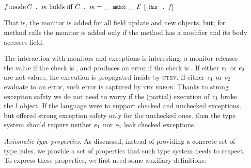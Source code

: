 $%
\f\, \text{inside}\, C\singleDot\m\text{ holds iff }
C\singleDot\m=\_\,\Kw{method}\_\,\ctx[\Kw{this}\singleDot\f]
$


That is, the monitor is added for all field update and new objects, but;
for method calls the monitor is added only if the method has a \Q@mut@ modifier and its body accesses \Q@capsule@ field.

The interaction with monitors and exceptions is interesting:
a monitor releases the value if the check is \Q@true@, and produces an error if the 
check is \Q@false@.
If either ${\mathit{e}}_1$ or ${\mathit{e}}_2$ are not values, the execution is propagated inside
by \textsc{ctxv}.
If either ${\mathit{e}}_1$ or ${\mathit{e}}_2$ evaluate to an error, such error is captured by 
\textsc{try error}.
Thanks to strong exception safety
we do not need to worry
if the (partial) execution of ${\mathit{e}}_1$ broke the $l$ object.
If the language were to support checked and unchecked exceptions, but offered 
strong exception safety only for the unchecked ones, then 
the type system should require neither ${\mathit{e}}_1$ nor ${\mathit{e}}_2$ leak 
checked exceptions.








\loseSpace
\noindent\textit{Axiomatic type properties:}
As discussed, instead of providing a concrete set of type rules, we provide a set of properties
that such type system needs to respect.
To express these properties, we first need some auxiliary definitions:


